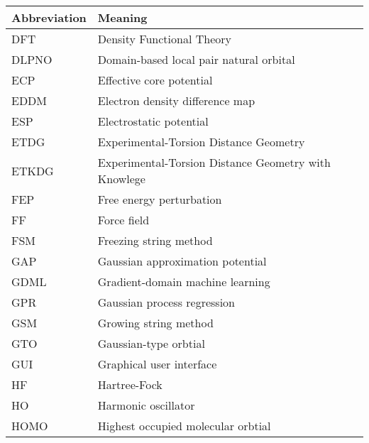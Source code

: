 \documentclass[../main.tex]{subfiles}
\begin{document}
\begin{table}[h!]
\def\arraystretch{2.0}
\begin{tabularx}{\textwidth}{YY}
Abbreviation & Meaning \\
\hline
DFT	&	Density Functional Theory	\\
DLPNO	&	Domain-based local pair natural orbital	\\
ECP	&	Effective core potential	\\
EDDM	&	Electron density difference map	\\
ESP	&	Electrostatic potential	\\
ETDG	&	Experimental-Torsion Distance Geometry	\\
ETKDG	&	Experimental-Torsion Distance Geometry with Knowlege	\\
FEP	&	Free energy perturbation	\\
FF	&	Force field	\\
FSM	&	Freezing string method	\\
GAP	&	Gaussian approximation potential	\\
GDML	&	Gradient-domain machine learning	\\
GPR	&	Gaussian process regression	\\
GSM	&	Growing string method	\\
GTO	&	Gaussian-type orbtial	\\
GUI	&	Graphical user interface	\\
HF	&	Hartree-Fock	\\
HO	&	Harmonic oscillator	\\
HOMO	&	Highest occupied molecular orbtial	\\
\end{tabularx}
\end{table}
\newpage
\end{document}
